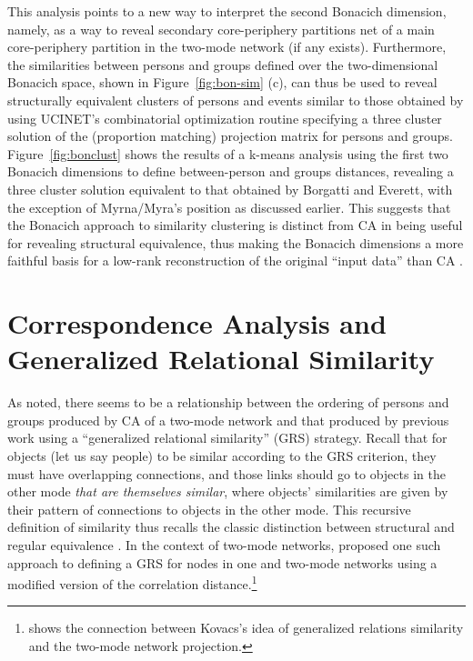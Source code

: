 \documentclass[a4paper,fleqn]{cas-sc}
\begin{document}
This analysis points to a new way to interpret the second Bonacich dimension, namely, as a way to reveal secondary core-periphery partitions net of a main core-periphery partition in the two-mode network (if any exists). Furthermore, the similarities between persons and groups defined over the two-dimensional Bonacich space, shown in Figure~\ref{fig:bon-sim} (c), can thus be used to reveal structurally equivalent clusters of persons and events similar to those obtained by \citet[Table 5]{everett2013dual} using UCINET's combinatorial optimization routine specifying a three cluster solution of the (proportion matching) projection matrix for persons and groups. Figure~\ref{fig:bonclust} shows the results of a k-means analysis using the first two Bonacich dimensions to define between-person and groups distances, revealing a three cluster solution equivalent to that obtained by Borgatti and Everett, with the exception of Myrna/Myra's position as discussed earlier. This suggests that the Bonacich approach to similarity clustering is distinct from CA in being useful for revealing structural equivalence, thus making the Bonacich dimensions a more faithful basis for a low-rank reconstruction of the original ``input data'' than CA \citep{desposito2014comparison}. 

\section{Correspondence Analysis and Generalized Relational Similarity} \label{sec:cagensim}
As noted, there seems to be a relationship between the ordering of persons and groups produced by CA of a two-mode network and that produced by previous work using a ``generalized relational similarity'' (GRS) strategy. Recall that for objects (let us say people) to be similar according to the GRS criterion, they must have overlapping connections, and those links should go to objects in the other mode \textit{that are themselves similar}, where objects' similarities are given by their pattern of connections to objects in the other mode. This recursive definition of similarity thus recalls the classic distinction between structural and regular equivalence \citep{everett1994regular}. In the context of two-mode networks, \citet{kovacs2010generalized} proposed one such approach to defining a GRS for nodes in one and two-mode networks using a modified version of the correlation distance.\footnote{\citet{lizardo2024two} shows the connection between Kovacs's idea of generalized relations similarity and the two-mode network projection.}
\end{document}
